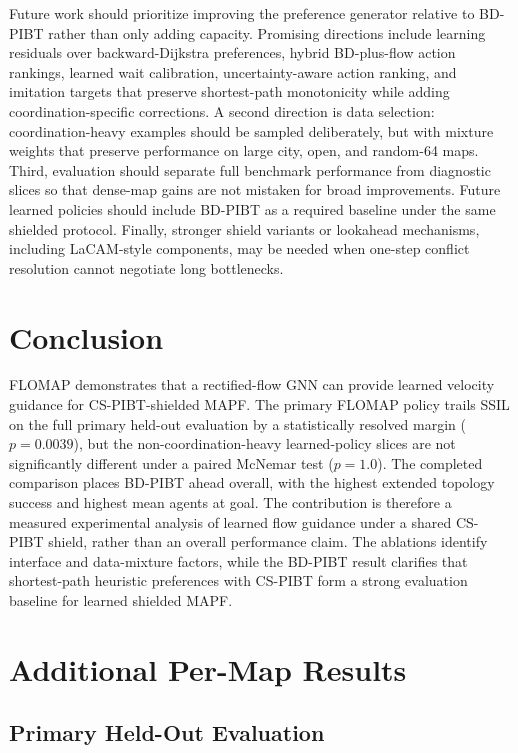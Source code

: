 \documentclass[conference]{IEEEtran}
\begin{document}
Future work should prioritize improving the preference generator relative to
BD-PIBT rather than only adding capacity.  Promising directions include learning
residuals over backward-Dijkstra preferences, hybrid BD-plus-flow action
rankings, learned wait calibration, uncertainty-aware action ranking, and
imitation targets that preserve shortest-path monotonicity while adding
coordination-specific corrections.  A second direction is data selection:
coordination-heavy examples should be sampled deliberately, but with mixture
weights that preserve performance on large city, open, and random-64 maps.
Third, evaluation should separate full benchmark performance from diagnostic
slices so that dense-map gains are not mistaken for broad improvements.  Future
learned policies should include BD-PIBT as a required baseline under the same
shielded protocol.  Finally, stronger shield variants or lookahead mechanisms,
including LaCAM-style components, may be needed when one-step conflict
resolution cannot negotiate long bottlenecks.

\section{Conclusion}

FLOMAP demonstrates that a rectified-flow GNN can provide learned
velocity guidance for CS-PIBT-shielded MAPF.  The primary FLOMAP policy trails
SSIL on the full primary held-out evaluation by a statistically resolved margin
($p=0.0039$), but the non-coordination-heavy learned-policy slices are not
significantly different under a paired McNemar test ($p=1.0$).  The
completed comparison places BD-PIBT ahead overall, with the highest extended
topology success and highest mean agents at goal.  The
contribution is therefore a measured experimental analysis of learned flow
guidance under a shared CS-PIBT shield, rather than an overall performance
claim.  The ablations identify interface and data-mixture factors,
while the BD-PIBT result
clarifies that shortest-path heuristic preferences with CS-PIBT form a strong
evaluation baseline for learned shielded MAPF.

\appendices

\section{Additional Per-Map Results}
\vspace{0.25em}

\subsection{Primary Held-Out Evaluation}
\label{tab:appendix-primary-per-map}
\vspace{0.25em}
\end{document}
